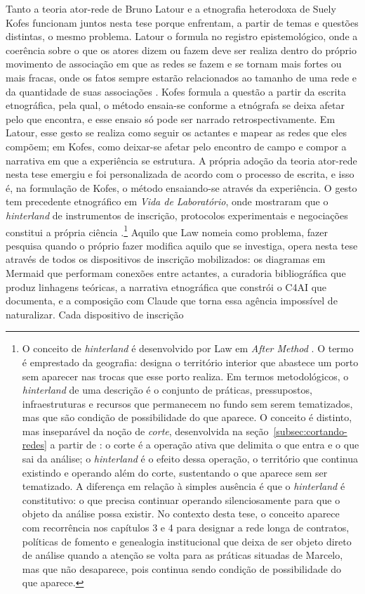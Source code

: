 Tanto a teoria ator-rede de Bruno Latour e a etnografia heterodoxa de Suely Kofes funcionam juntos nesta tese porque enfrentam, a partir de temas e questões distintas, o mesmo problema. Latour o formula no registro epistemológico, onde a coerência sobre o que os atores dizem ou fazem deve ser realiza dentro do próprio movimento de associação em que as redes se fazem e se tornam mais fortes ou mais fracas, onde os fatos sempre estarão relacionados ao tamanho de uma rede e da quantidade de suas associações \parencite[p.~331]{Latour2011CienciaEmAcao}. Kofes formula a questão a partir da escrita etnográfica, pela qual, o método ensaia-se conforme a etnógrafa se deixa afetar pelo que encontra, e esse ensaio só pode ser narrado retrospectivamente. Em Latour, esse gesto se realiza como seguir os actantes e mapear as redes que eles compõem; em Kofes, como deixar-se afetar pelo encontro de campo e compor a narrativa em que a experiência se estrutura. A própria adoção da teoria ator-rede nesta tese emergiu e foi personalizada de acordo com o processo de escrita, e isso é, na formulação de Kofes, o método ensaiando-se através da experiência. O gesto tem precedente etnográfico em \textit{Vida de Laboratório}, onde \textcite{Latour1997VidaLaboratorio} mostraram que o \textit{hinterland} de instrumentos de inscrição, protocolos experimentais e negociações constitui a própria ciência \parencite[p.~38]{Law2004After}.\footnote{O conceito de \textit{hinterland} é desenvolvido por Law em \textit{After Method} \parencite[pp.~34--42]{Law2004After}. O termo é emprestado da geografia: designa o território interior que abastece um porto sem aparecer nas trocas que esse porto realiza. Em termos metodológicos, o \textit{hinterland} de uma descrição é o conjunto de práticas, pressupostos, infraestruturas e recursos que permanecem no fundo sem serem tematizados, mas que são condição de possibilidade do que aparece. O conceito é distinto, mas inseparável da noção de \textit{corte}, desenvolvida na seção~\ref{subsec:cortando-redes} a partir de \textcite{strathern2011cortando}: o corte é a operação ativa que delimita o que entra e o que sai da análise; o \textit{hinterland} é o efeito dessa operação, o território que continua existindo e operando além do corte, sustentando o que aparece sem ser tematizado. A diferença em relação à simples ausência é que o \textit{hinterland} é constitutivo: o que precisa continuar operando silenciosamente para que o objeto da análise possa existir. No contexto desta tese, o conceito aparece com recorrência nos capítulos 3 e 4 para designar a rede longa de contratos, políticas de fomento e genealogia institucional que deixa de ser objeto direto de análise quando a atenção se volta para as práticas situadas de Marcelo, mas que não desaparece, pois continua sendo condição de possibilidade do que aparece.} Aquilo que Law nomeia como problema, fazer pesquisa quando o próprio fazer modifica aquilo que se investiga, opera nesta tese através de todos os dispositivos de inscrição mobilizados: os diagramas em Mermaid que performam conexões entre actantes, a curadoria bibliográfica que produz linhagens teóricas, a narrativa etnográfica que constrói o C4AI que documenta, e a composição com Claude que torna essa agência impossível de naturalizar. Cada dispositivo de inscrição 